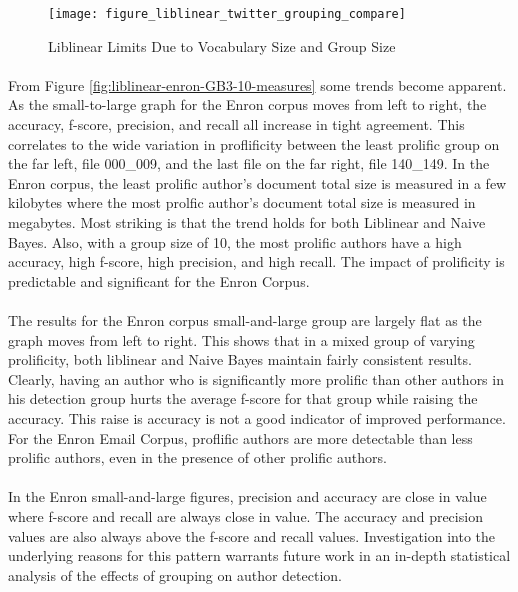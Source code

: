 \begin{figure}[htbp!]
	\begin{center}
	\centering
	\texttt{[image: figure\_liblinear\_twitter\_grouping\_compare]}
	\caption{Liblinear Limits Due to Vocabulary Size and Group Size}
	\label{fig:liblinear-twitter-GB3-10-measures}
	\end{center}
\end{figure}
	
	\paragraph*{} From Figure \ref{fig:liblinear-enron-GB3-10-measures} some trends become apparent.  As the small-to-large graph for the Enron corpus moves from left to right, the accuracy, f-score, precision, and recall all increase in tight agreement.  This correlates to the wide variation in proflificity between the least prolific group on the far left, file 000\_009, and the last file on the far right, file 140\_149.  In the Enron corpus, the least prolific author's document total size is measured in a few kilobytes where the most prolfic author's document total size is measured in megabytes.  Most striking is that the trend holds for both Liblinear and Naive Bayes.  Also, with a group size of 10, the most prolific authors have a high accuracy, high f-score, high precision, and high recall.  The impact of prolificity is predictable and significant for the Enron Corpus.
	\paragraph*{} The results for the Enron corpus small-and-large group are largely flat as the graph moves from left to right.  This shows that in a mixed group of varying prolificity, both liblinear and Naive Bayes maintain fairly consistent results.  Clearly, having an author who is significantly more prolific than other authors in his detection group hurts the average f-score for that group while raising the accuracy.  This raise is accuracy is not a good indicator of improved performance.  For the Enron Email Corpus, proflific authors are more detectable than less prolific authors, even in the presence of other prolific authors.
	\paragraph*{} In the Enron small-and-large figures, precision and accuracy are close in value where f-score and recall are always close in value.  The accuracy and precision values are also always above the f-score and recall values.  Investigation into the underlying reasons for this pattern warrants future work in an in-depth statistical analysis of the effects of grouping on author detection.
